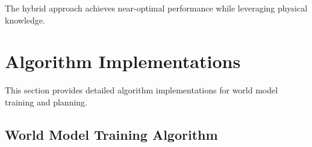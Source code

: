 The hybrid approach achieves near-optimal performance while leveraging physical knowledge.

\section{Algorithm Implementations}
\label{sec:world_model_algorithms}

This section provides detailed algorithm implementations for world model training and planning.

\subsection{World Model Training Algorithm}

